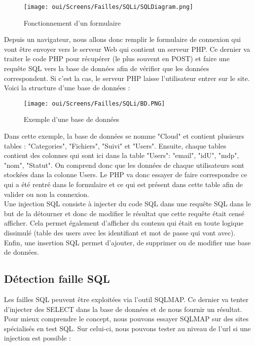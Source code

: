 \begin{figure}[htp!]
  \centering
  \setlength\figureheight{7cm}
  \setlength\figurewidth{9cm}
  \texttt{[image: oui/Screens/Failles/SQLi/SQLDiagram.png]}
  \caption{Fonctionnement d'un formulaire}
  \label{fig:courbe-tikz}
\end{figure}

\newpage
Depuis un navigateur, nous allons donc remplir le formulaire de connexion qui vont être envoyer vers le serveur Web qui contient un serveur PHP. Ce dernier va traiter le code PHP pour récupérer (le plus souvent en POST) et faire une requête SQL vers la base de données afin de vérifier que les données correspondent. Si c'est la cas, le serveur PHP laisse l'utilisateur entrer sur le site.\\
Voici la structure d'une base de données :

\begin{figure}[htp!]
  \centering
  \setlength\figureheight{7cm}
  \setlength\figurewidth{9cm}
  \texttt{[image: oui/Screens/Failles/SQLi/BD.PNG]}
  \caption{Exemple d'une base de données}
  \label{fig:courbe-tikz}
\end{figure}

Dans cette exemple, la base de données se nomme "Cloud" et contient plusieurs tables : "Categories", "Fichiers", "Suivi" et "Users". Ensuite, chaque tables contient des colonnes qui sont ici dans la table "Users": "email", "idU", "mdp", "nom", "Statut". On comprend donc que les données de chaque utilisateurs sont stockées dans la colonne Users. Le PHP va donc essayer de faire correspondre ce qui a été rentré dans le formulaire et ce qui est présent dans cette table afin de valider ou non la connexion.\\
Une injection SQL consiste à injecter du code SQL dans une requête SQL dans le but de la détourner et donc de modifier le résultat que cette requête était censé afficher. Cela permet également d’afficher du contenu qui était en toute logique dissimulé (table des users avec les identifiant et mot de passe qui vont avec). Enfin, une insertion SQL permet d’ajouter, de supprimer ou de modifier une base de données.

\subsection{Détection faille SQL}

Les failles SQL peuvent être exploitées via l’outil SQLMAP. Ce dernier va tenter d’injecter des SELECT dans la base de données et de nous fournir un résultat. Pour mieux comprendre le concept, nous pouvons essayer SQLMAP sur des sites spécialisés en test SQL. Sur celui-ci, nous pouvons tester au niveau de l’url si une injection est possible :


